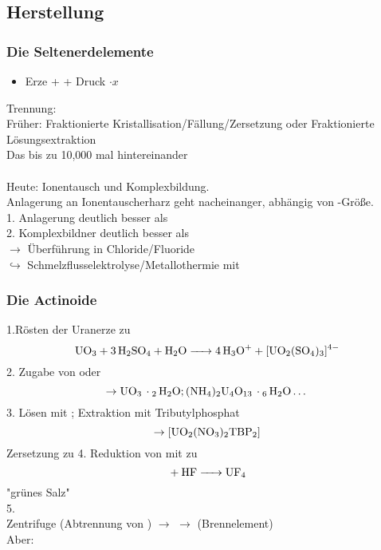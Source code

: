 \documentclass[a4paper, fleqn]{article}
\begin{document}
\subsection{Herstellung}
\subsubsection{Die Seltenerdelemente}
\begin{itemize}
    \item Erze +  + Druck $\cdot x$
\end{itemize}
Trennung:\\
Früher: Fraktionierte Kristallisation/Fällung/Zersetzung oder Fraktionierte Lösungsextraktion\\
Das bis zu 10,000 mal hintereinander\\\\
Heute: Ionentausch und Komplexbildung.\\
Anlagerung an Ionentauscherharz geht nacheinanger, abhängig von -Größe.\\
1. Anlagerung  deutlich besser als \\
2. Komplexbildner  deutlich besser als \\
$\rightarrow$ Überführung in Chloride/Fluoride\\
$\hookrightarrow$ Schmelzflusselektrolyse/Metallothermie mit 

\subsubsection{Die Actinoide}
1.Rösten der Uranerze zu 
\begin{equation*}
    \ce{UO3 + 3 H2SO4 + H2O -> 4 H3O^{+} + [UO2(SO4)3]^{4-}}
\end{equation*}
2. Zugabe von  oder 
\begin{equation*}
    \rightarrow \ce{UO3 \cdot 2 H2O}; \ce{(NH4)2U4O13 \cdot 6 H2O} \dots
\end{equation*}
3. Lösen mit ; Extraktion mit Tributylphosphat
\begin{equation*}
    \rightarrow \ce{[UO2(NO3)2TBP2]}
\end{equation*}
Zersetzung zu 
4. Reduktion von  mit  zu \\
\begin{equation*}
    \ce{+ HF -> UF4}
\end{equation*}
"grünes Salz"\\
5. \\
Zentrifuge (Abtrennung von ) $\rightarrow$  $\rightarrow$  (Brennelement)\\
Aber: 
\end{document}

